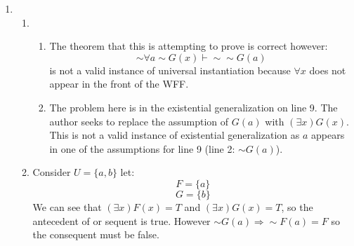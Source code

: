 \documentclass[11pt] {article}
\begin{document}
\begin{enumerate}
\begin{enumerate}
\[\begin{tabular} {L|L|L|LL}
			10 & (1,3) & (\exists x) \sim F(x) & 9 & \exists-I \\
			11 & (1,2) & (\exists x) \sim F(x) & 2,3,10 & \exists-E \\
 		\end{tabular}
		\]
		\item $(\forall a) (\forall y)(H(y,y) \Rightarrow \sim H(y,y))\vdash  (\forall a) \sim H(x,x) $
		\[
		\begin{tabular}{L|L|L|LL}
			\hline
			1 & (1) & (\forall a) (\forall y)(H(y,y) \Rightarrow \sim H(y,y)) & A &  \\
			2 & (1) & (\forall y) (H(y,y) \Rightarrow \sim H(y,y) & 1 & \forall - E \\
			3 & (1) & H(a,a) \Rightarrow \sim H(a,a) & 2 & \forall - E \\
			4 & (4) & H(a,a) & A &  \\
			5 & (1,4) & \sim H(a,a) & 3,4 & MP \\
			6 & (1,4) & H(a,a) \land \sim H(a,a) & 5,6 & \land - I \\
			8 & (1) & \sim H(a,a) & 1,4,6 & AA \\
			9 & (1) & (\forall a) \sim H(x,x) & 8 & \forall - I \\
		\end{tabular}
		\]
	\end{enumerate}
	\item 
	\begin{enumerate}
		\item
		\begin{enumerate}
			\item The theorem that this is attempting to prove is correct however: $$\sim \forall a \sim G(x) \vdash \sim \sim G(a)$$ is not a valid instance of universal instantiation because $\forall x$ does not appear in the front of the WFF. 
			\item The problem here is in the existential generalization on line 9. The author seeks to replace the assumption of $G(a)$ with $(\exists x)G(x)$. This is not a valid instance of existential generalization as $a$ appears in one of the assumptions for line 9 (line 2: $\sim G(a)$).
		\end{enumerate}
	\item Consider $U = \{a,b\}$ let:
		$$F = \{a\}$$
			$$G = \{b\}$$
		We can see that $(\exists x)F(x) = T$ and $(\exists x)G(x) = T$, so the antecedent of or sequent is true. However $\sim G(a) \Rightarrow \sim F(a) = F$ so the consequent must be false.
	\end{enumerate}

\end{enumerate}
\end{document}
